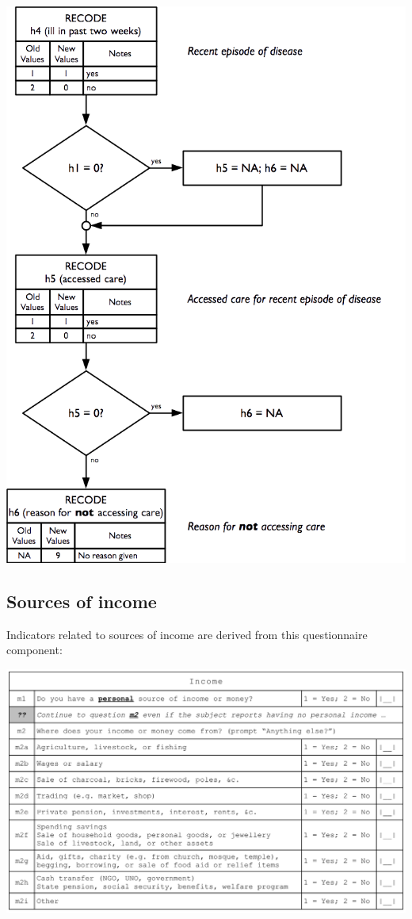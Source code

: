 \documentclass[12pt,a4paper]{book}
\theoremstyle{definition}
\theoremstyle{definition}
\theoremstyle{definition}
\theoremstyle{remark}
\begin{document}
\begin{center}\includegraphics{figures/indicators22} \end{center}

\hypertarget{sources-of-income}{%
\subsection{Sources of income}\label{sources-of-income}}

Indicators related to sources of income are derived from this
questionnaire component:

\begin{center}\includegraphics{figures/questionnaire09} \end{center}
\end{document}
